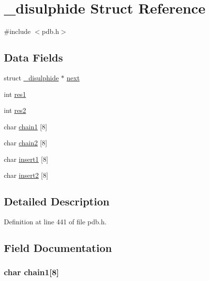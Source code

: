\hypertarget{struct__disulphide}{\section{\-\_\-disulphide Struct Reference}
\label{struct__disulphide}
}


{\ttfamily \#include $<$pdb.\-h$>$}

\subsection*{Data Fields}
\begin{DoxyCompactItemize}
\item 
struct \hyperlink{struct__disulphide}{\-\_\-disulphide} $\ast$ \hyperlink{struct__disulphide_a8cd57ab6b7776ee66ce1877be655e689}{next}
\item 
int \hyperlink{struct__disulphide_ab0c79f65dfbf2f2f2d7e108f73fe6f18}{res1}
\item 
int \hyperlink{struct__disulphide_ab2a9ff6fb3a64621cb23e1eb1290e043}{res2}
\item 
char \hyperlink{struct__disulphide_a8cedbe7b30d9930ce6574f146e6ca7d7}{chain1} \mbox{[}8\mbox{]}
\item 
char \hyperlink{struct__disulphide_a0b12586562770f31367fa9a7af4a1b09}{chain2} \mbox{[}8\mbox{]}
\item 
char \hyperlink{struct__disulphide_a40813cb2e390608ac9828d857950ffd1}{insert1} \mbox{[}8\mbox{]}
\item 
char \hyperlink{struct__disulphide_aa36703384eb0aaa384cc934ddfee1882}{insert2} \mbox{[}8\mbox{]}
\end{DoxyCompactItemize}


\subsection{Detailed Description}


Definition at line 441 of file pdb.\-h.



\subsection{Field Documentation}
\hypertarget{struct__disulphide_a8cedbe7b30d9930ce6574f146e6ca7d7}{
\subsubsection[{chain1}]{\setlength{\rightskip}{0pt plus 5cm}char chain1\mbox{[}8\mbox{]}}}\label{struct__disulphide_a8cedbe7b30d9930ce6574f146e6ca7d7}


